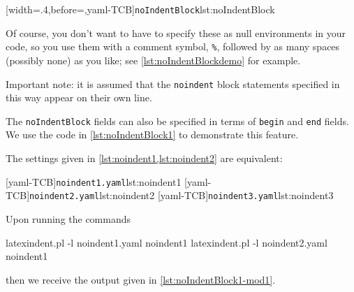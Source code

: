  [width=.4\linewidth,before=\centering,yaml-TCB]{\texttt{noIndentBlock}}{lst:noIndentBlock}

 Of course, you don't want to have to specify these as null environments in your code, so
 you use them with a comment symbol, \lstinline!%!, followed by as many spaces (possibly
 none) as you like; see \cref{lst:noIndentBlockdemo} for example.


 Important note: it is assumed that the \texttt{noindent} block statements specified in
 this way appear on their own line.

 \begin{example}
 The \texttt{noIndentBlock} fields can also be specified in terms of \texttt{begin} and
 \texttt{end} fields. We use the code in \cref{lst:noIndentBlock1} to demonstrate this
 feature.%


 The settings given in \cref{lst:noindent1,lst:noindent2} are equivalent:

 \begin{cmhtcbraster}[raster columns=3,
   raster left skip=-3.5cm,
   raster right skip=-2cm,
   raster column skip=.03\linewidth]
  [yaml-TCB]{\texttt{noindent1.yaml}}{lst:noindent1}
  [yaml-TCB]{\texttt{noindent2.yaml}}{lst:noindent2}
  [yaml-TCB]{\texttt{noindent3.yaml}}{lst:noindent3}
 \end{cmhtcbraster}

 Upon running the commands

 \begin{commandshell}
latexindent.pl -l noindent1.yaml noindent1
latexindent.pl -l noindent2.yaml noindent1
\end{commandshell}

 then we receive the output given in \cref{lst:noIndentBlock1-mod1}.


 \end{example}

